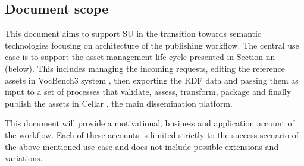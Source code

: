 	\subsection{Document scope}
	\label{sec:scope}
	
	This document aims to support SU in the transition towards semantic technologies focusing on architecture of the publishing workflow. 
	The central use case is to support the asset management life-cycle presented in Section nn (below). This includes managing the incoming requests, editing the reference assets in VocBench3 system \citep{stellato2017towards,stellatovocbench}, then exporting the RDF data and passing them as input to a set of processes that validate, assess, transform, package and finally publish the assets in Cellar \cite{cdm-francesconi2015ontology}, the main dissemination platform.
	
	This document will provide a motivational, business and application account of the workflow. Each of these accounts is limited strictly to the success scenario of the above-mentioned use case and does not include possible extensions and variations. 
	

